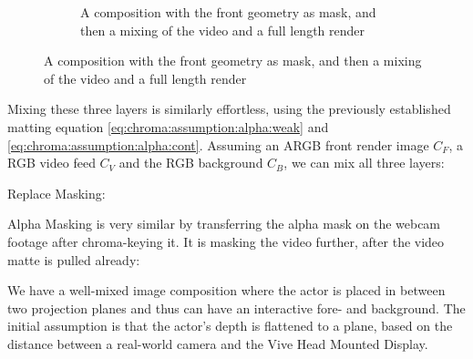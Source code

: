 \begin{figure}[htbp]
\begin{subfigure}[t]{.45\textwidth}
		\caption{A composition with the front geometry as mask, and then a 
		mixing of the video and a full length render}
	\end{subfigure}
\end{figure}

Mixing these three layers is similarly effortless, using the previously 
established matting equation \eqref{eq:chroma:assumption:alpha:weak} and 
\eqref{eq:chroma:assumption:alpha:cont}. Assuming an ARGB front render image 
$C_F$, a RGB video feed  $C_V$ and the RGB background $C_B$, 
we can mix all three layers:

Replace Masking:







Alpha Masking is very similar by transferring the alpha mask on the webcam 
footage after chroma-keying it. It is masking the video further, after the 
video matte is pulled already:




We have a well-mixed image composition where the actor is placed in between 
two projection planes and thus can have an interactive fore- and background. 
The initial assumption is that the actor's depth is flattened to a plane, based 
on the distance between a real-world camera and the Vive Head Mounted Display.
